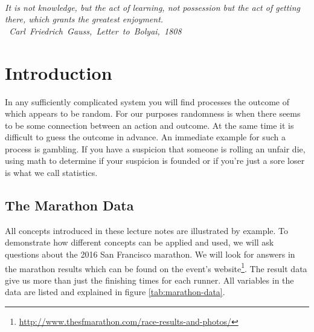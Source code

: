 \documentclass{tufte-book} %
\begin{document}

\tableofcontents %






\cleardoublepage
~\vfill
\begin{doublespace}
\noindent\fontsize{18}{22}\selectfont\itshape
\nohyphenation
It is not knowledge, but the act of learning, not possession but the act of getting there, which grants the greatest enjoyment.\\ \mbox{ Carl Friedrich Gauss, {\itshape Letter to Bolyai, 1808}}
\end{doublespace}
\vfill
\vfill

\cleardoublepage

\mainmatter


\chapter{Introduction}
In any sufficiently complicated system you will find processes the outcome of which appears to be random. For our purposes randomness is when there seems to be some connection between an action and outcome. At the same time it is difficult to guess the outcome in advance. An immediate example for such a process is gambling. If you have a suspicion that someone is rolling an unfair die, using math to determine if your suspicion is founded or if you're just a sore loser is what we call statistics.

\section{The Marathon Data}
All concepts introduced in these lecture notes are illustrated by example. To demonstrate how different concepts can be applied and used, we will ask questions about the 2016 San Francisco marathon. We will look for answers in the marathon results which can be found on the event's website\footnote{\url{http://www.thesfmarathon.com/race-results-and-photos/}}. The result data give us more than just the finishing times for each runner. All variables in the data are listed and explained in figure \ref{tab:marathon-data}.
\end{document}
